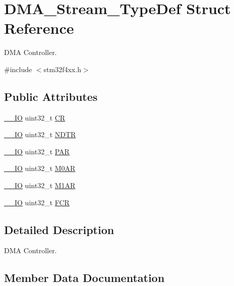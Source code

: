\hypertarget{struct_d_m_a___stream___type_def}{}\section{D\+M\+A\+\_\+\+Stream\+\_\+\+Type\+Def Struct Reference}
\label{struct_d_m_a___stream___type_def}


D\+MA Controller.  




{\ttfamily \#include $<$stm32f4xx.\+h$>$}

\subsection*{Public Attributes}
\begin{DoxyCompactItemize}
\item 
\hyperlink{core__cm4_8h_aec43007d9998a0a0e01faede4133d6be}{\+\_\+\+\_\+\+IO} uint32\+\_\+t \hyperlink{struct_d_m_a___stream___type_def_af893adc5e821b15d813237b2bfe4378b}{CR}
\item 
\hyperlink{core__cm4_8h_aec43007d9998a0a0e01faede4133d6be}{\+\_\+\+\_\+\+IO} uint32\+\_\+t \hyperlink{struct_d_m_a___stream___type_def_a2cc2a52628182f9e79ab1e49bb78a1eb}{N\+D\+TR}
\item 
\hyperlink{core__cm4_8h_aec43007d9998a0a0e01faede4133d6be}{\+\_\+\+\_\+\+IO} uint32\+\_\+t \hyperlink{struct_d_m_a___stream___type_def_adbeac1d47cb85ab52dac71d520273947}{P\+AR}
\item 
\hyperlink{core__cm4_8h_aec43007d9998a0a0e01faede4133d6be}{\+\_\+\+\_\+\+IO} uint32\+\_\+t \hyperlink{struct_d_m_a___stream___type_def_a965da718db7d0303bff185d367d96fd6}{M0\+AR}
\item 
\hyperlink{core__cm4_8h_aec43007d9998a0a0e01faede4133d6be}{\+\_\+\+\_\+\+IO} uint32\+\_\+t \hyperlink{struct_d_m_a___stream___type_def_a142ca5a1145ba9cf4cfa557655af1c13}{M1\+AR}
\item 
\hyperlink{core__cm4_8h_aec43007d9998a0a0e01faede4133d6be}{\+\_\+\+\_\+\+IO} uint32\+\_\+t \hyperlink{struct_d_m_a___stream___type_def_aad3d78ab35e7af48951be5be53392f9f}{F\+CR}
\end{DoxyCompactItemize}


\subsection{Detailed Description}
D\+MA Controller. 

\subsection{Member Data Documentation}
